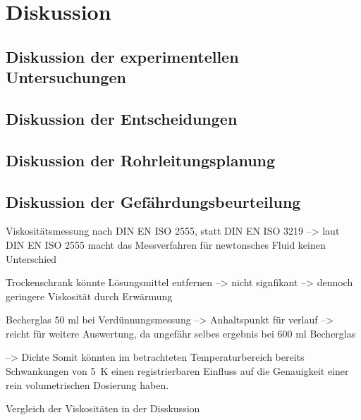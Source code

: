 \section{Diskussion}
\label{sec:diskussion}

\subsection{Diskussion der experimentellen Untersuchungen}

\subsection{Diskussion der Entscheidungen}

\subsection{Diskussion der Rohrleitungsplanung}

\subsection{Diskussion der Gefährdungsbeurteilung}

Viskositätsmessung nach DIN EN ISO 2555, statt DIN EN ISO 3219 --> laut DIN EN ISO 2555 macht das Messverfahren für newtonsches Fluid keinen Unterschied

Trockenschrank könnte Lösungsmittel entfernen --> nicht signfikant --> dennoch geringere Viskosität durch Erwärmung

Becherglas 50 ml bei Verdünnungsmessung --> Anhaltspunkt für verlauf --> reicht für weitere Auswertung, da ungefähr selbes ergebnis bei 600 ml Becherglas

--> Dichte Somit könnten im betrachteten Temperaturbereich bereits Schwankungen von \SI{5}{\kelvin} einen registrierbaren Einfluss auf die Genauigkeit einer rein volumetrischen Dosierung haben.

Vergleich der Viskositäten in der Disskussion